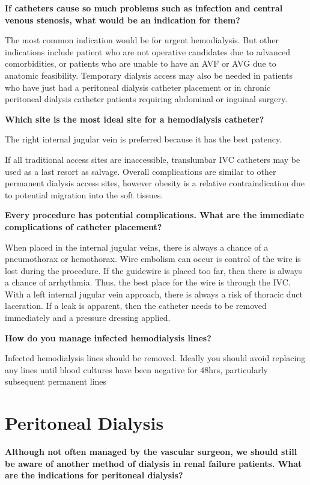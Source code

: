 \documentclass[
]{book}
\begin{document}
\textbf{If catheters cause so much problems such as infection and central
venous stenosis, what would be an indication for them?}

The most common indication would be for urgent hemodialysis. But other
indications include patient who are not operative candidates due to
advanced comorbidities, or patients who are unable to have an AVF or AVG
due to anatomic feasibility. Temporary dialysis access may also be
needed in patients who have just had a peritoneal dialysis catheter
placement or in chronic peritoneal dialysis catheter patients requiring
abdominal or inguinal surgery.

\textbf{Which site is the most ideal site for a hemodialysis catheter?}

The right internal jugular vein is preferred because it has the best
patency.

If all traditional access sites are inaccessible, translumbar IVC
catheters may be used as a last resort as salvage. Overall complications
are similar to other permanent dialysis access sites, however obesity is
a relative contraindication due to potential migration into the soft
tissues.

\textbf{Every procedure has potential complications. What are the immediate
complications of catheter placement?}

When placed in the internal jugular veins, there is always a chance of a
pneumothorax or hemothorax. Wire embolism can occur is control of the
wire is lost during the procedure. If the guidewire is placed too far,
then there is always a chance of arrhythmia. Thus, the best place for
the wire is through the IVC. With a left internal jugular vein approach,
there is always a risk of thoracic duct laceration. If a leak is
apparent, then the catheter needs to be removed immediately and a
pressure dressing applied.

\textbf{How do you manage infected hemodialysis lines?}

Infected hemodialysis lines should be removed. Ideally you should avoid
replacing any lines until blood cultures have been negative for 48hrs,
particularly subsequent permanent
lines\citep{vascularaccess2006workgroup2006}

\hypertarget{peritoneal-dialysis}{%
\section{Peritoneal Dialysis}\label{peritoneal-dialysis}}

\textbf{Although not often managed by the vascular surgeon, we should still be
aware of another method of dialysis in renal failure patients. What are
the indications for peritoneal dialysis?}
\end{document}

